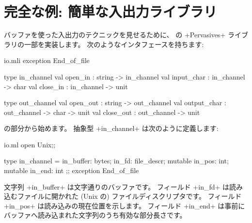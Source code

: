 \section{完全な例: 簡単な入出力ライブラリ}

バッファを使った入出力のテクニックを見せるために、
\ocaml の \ml+Pervasives+ ライブラリの一部を実装します。 次のようなインタフェースを持ちます:
%
\begin{listingcodefile}{io.mli}
exception End_of_file

type in_channel
val open_in : string -> in_channel
val input_char : in_channel -> char
val close_in : in_channel -> unit

type out_channel
val open_out : string -> out_channel
val output_char : out_channel -> char -> unit
val close_out : out_channel -> unit
\end{listingcodefile}
%
 の部分から始めます。
抽象型 \ml+in_channel+ は次のように定義します:
%
\begin{listingcodefile}{io.ml}
open Unix;;

type in_channel =
  { in_buffer: bytes;
    in_fd: file_descr;
    mutable in_pos: int;
    mutable in_end: int };;
exception End_of_file
\end{listingcodefile}
%
文字列 \ml+in_buffer+ は文字通りのバッファです。
フィールド \ml+in_fd+ は読み込むファイルに開かれた (Unix の) ファイルディスクリプタです。
フィールド \ml+in_pos+ は読み込みの現在位置を示します。
フィールド \ml+in_end+ は事前にバッファへ読み込まれた文字列のうち有効な部分長さです。
%
